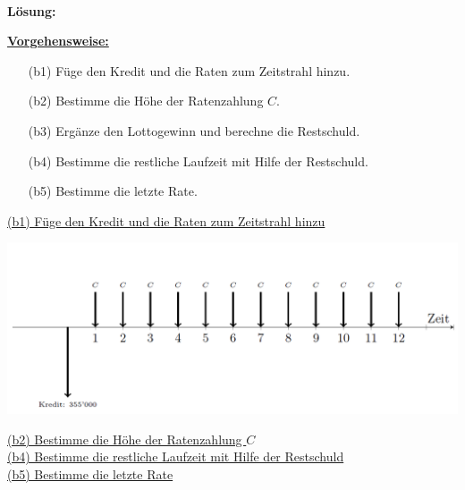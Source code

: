 \ \\
\textbf{Lösung:}
\begin{mdframed}
\underline{\textbf{Vorgehensweise:}}
\begin{enumerate}
\item[(b1)] Füge den Kredit und die Raten zum Zeitstrahl hinzu.
\item[(b2)] Bestimme die Höhe der Ratenzahlung $ C $.
\item[(b3)] Ergänze den Lottogewinn und berechne die Restschuld.
\item[(b4)] Bestimme die restliche Laufzeit mit Hilfe der Restschuld.
\item[(b5)] Bestimme die letzte Rate.
\end{enumerate}
\end{mdframed}

\newpage
\underline{(b1) Füge den Kredit und die Raten zum Zeitstrahl hinzu}\\
\begin{center}
	\includegraphics[scale=0.55]{pictures/zeitstrahl_1_b_filled_1}
\end{center}

\underline{(b2) Bestimme die Höhe der Ratenzahlung $ C $}\\


\underline{(b4) Bestimme die restliche Laufzeit mit Hilfe der Restschuld}\\

\underline{(b5) Bestimme die letzte Rate}\\

\newpage
